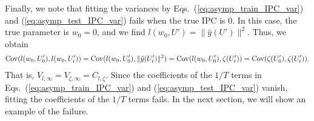 \documentclass{article}
\begin{document}
Finally, we note that fitting the variances by Eqs.~(\ref{eq:asymp_train_IPC_var}) and (\ref{eq:asymp_test_IPC_var}) fails when the true IPC is $0$. 
In this case, the true parameter is $w_0 = 0$, and we find $l(w_0, U') = \|\hat{y}(U')\|^2$. 
Thus, we obtain 
\begin{align}
 {\rm Cov}(l(w_0, U'_0), l(w_0, U'_t)) = {\rm Cov}(l(w_0, U'_0), \|\hat{ y}(U'_t)\|^2)
 = {\rm Cov}(l(w_0, U'_0), \zeta(U'_t)) = {\rm Cov}(\zeta(U'_0) , \zeta(U'_t)).
\end{align}
That is, $V_{l, \infty} = V_{\zeta, \infty} = C_{l, \zeta}$. 
Since the coefficients of the $1/T$ terms in Eqs.~(\ref {eq:asymp_train_IPC_var}) and (\ref{eq:asymp_test_IPC_var}) vanish, fitting the coefficients of the $1/T$ terms fails. 
In the next section, we will show an example of the failure. 
\end{document}

